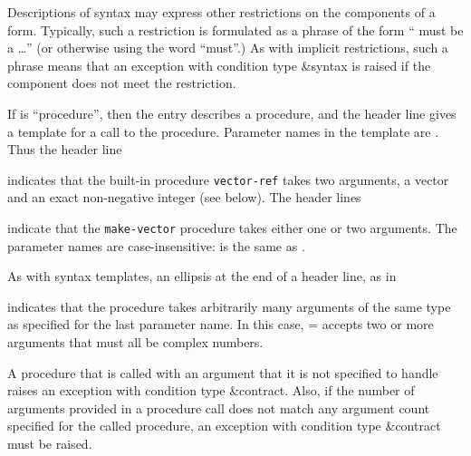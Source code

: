 Descriptions of syntax may express other restrictions on the
components of a form.  Typically, such a restriction is formulated
as a phrase of the form `` must be a \ldots'' (or otherwise
using the word ``must''.)  As with
implicit restrictions, such a phrase means that an exception with
condition type {\cf\&syntax} is raised if the component does not
meet the restriction.


If  is ``procedure'', then the entry describes a procedure, and
the header line gives a template for a call to the procedure.  Parameter
names in the template are .  Thus the header line

\noindent{}\unpenalty

indicates that the built-in procedure {\tt vector-ref} takes
two arguments, a vector  and an exact non-negative integer
 (see below).  The header lines

\noindent%
\unpenalty

indicate that the {\tt make-vector} procedure takes
either one or two arguments.  The parameter names are
case-insensitive:  is the same as .

As with syntax templates, an ellipsis \dotsfoo{} at the end of a header
line, as in


indicates that the procedure takes arbitrarily many arguments of the
same type as specified for the last parameter name.  In this case,
{\cf =} accepts two or more arguments that must all be complex
numbers.

\label{typeconventions}
A procedure that is called with an argument that it is not
specified to handle raises an exception with condition type
{\cf\&contract}.  Also, if the number of arguments provided in
a procedure call does not match any argument count specified for the
called procedure, an exception with condition type {\cf\&contract}
must be raised.

